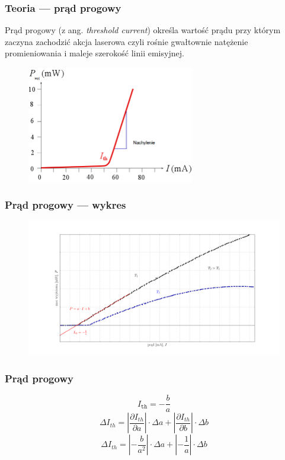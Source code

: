 \documentclass[xcolor={dvipsnames,table}]{beamer}
\begin{document}
\begin{frame}
\frametitle{Teoria --- prąd progowy}
Prąd progowy (z ang. \textit{threshold current}) określa wartość prądu przy którym zaczyna zachodzić akcja laserowa czyli rośnie gwałtownie natężenie promieniowania i maleje szerokość linii emisyjnej.
\begin{figure}
   \includegraphics[width=0.65\textwidth,natwidth=69,natheight=87]{slope.png}
\end{figure}
\end{frame}

\begin{frame}
\frametitle{Prąd progowy --- wykres}
\begin{figure}
\includegraphics[scale=0.20]{plot_theory.png}
\end{figure}
\end{frame}

\begin{frame}
\frametitle{Prąd progowy}
\center
\begin{equation*}
I_{\mathtt{th}} = -\frac{b}{a}
\end{equation*}
\begin{equation*}
\Delta I_{th} = \left\lvert \frac{\partial I_{th}}{\partial a} \right\rvert \cdot \Delta a + \left\lvert \frac{\partial I_{th}}{\partial b} \right\rvert \cdot \Delta b
\end{equation*}
\begin{equation*}
\Delta I_{th} = \left\lvert -\frac{b}{a^2} \right\rvert \cdot \Delta a + \left\lvert -\frac{1}{a} \right\rvert \cdot \Delta b 
\end{equation*}

\end{frame}
\end{document}
